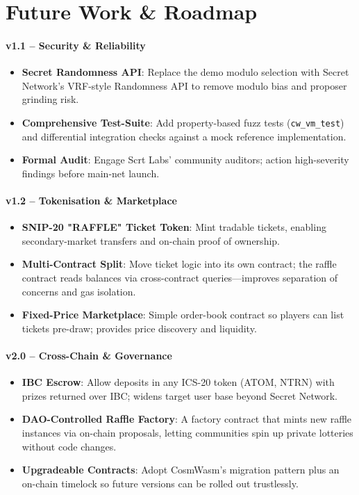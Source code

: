 \documentclass{article}
\begin{document}
\section{Future Work \& Roadmap}

\paragraph{v1.1 – Security \& Reliability}
\begin{itemize}
  \item \textbf{Secret Randomness API}: Replace the demo modulo selection with Secret Network's VRF-style Randomness API to remove modulo bias and proposer grinding risk.
  \item \textbf{Comprehensive Test-Suite}: Add property-based fuzz tests (\texttt{cw\_vm\_test}) and differential integration checks against a mock reference implementation.
  \item \textbf{Formal Audit}: Engage Scrt Labs' community auditors; action high-severity findings before main-net launch.
\end{itemize}

\paragraph{v1.2 – Tokenisation \& Marketplace}
\begin{itemize}
  \item \textbf{SNIP-20 "RAFFLE" Ticket Token}: Mint tradable tickets, enabling secondary-market transfers and on-chain proof of ownership.
  \item \textbf{Multi-Contract Split}: Move ticket logic into its own contract; the raffle contract reads balances via cross-contract queries—improves separation of concerns and gas isolation.
  \item \textbf{Fixed-Price Marketplace}: Simple order-book contract so players can list tickets pre-draw; provides price discovery and liquidity.
\end{itemize}

\paragraph{v2.0 – Cross-Chain \& Governance}
\begin{itemize}
  \item \textbf{IBC Escrow}: Allow deposits in any ICS-20 token (ATOM, NTRN) with prizes returned over IBC; widens target user base beyond Secret Network.
  \item \textbf{DAO-Controlled Raffle Factory}: A factory contract that mints new raffle instances via on-chain proposals, letting communities spin up private lotteries without code changes.
  \item \textbf{Upgradeable Contracts}: Adopt CosmWasm's migration pattern plus an on-chain timelock so future versions can be rolled out trustlessly.
\end{itemize}
\end{document}
